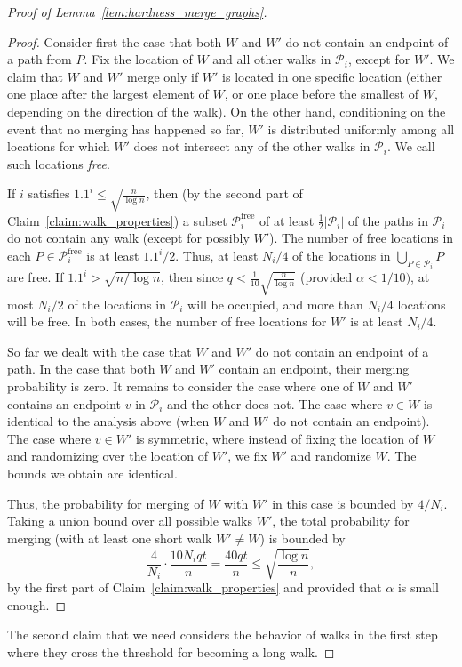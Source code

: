 \documentclass[11pt]{article}
\numberwithin{equation}{section}
\renewcommand{\P}{\mathcal{P}}
\newcommand{\1}{\mathbf{1}}
\begin{document}
\begin{proof}[Proof of Lemma~\ref{lem:hardness_merge_graphs}]
\begin{proof}
Consider first the case that both $W$ and $W'$ do not contain an endpoint of a path from $P$.
Fix the location of $W$ and all other walks in $\mathcal{P}_i$, except for $W'$. We claim that $W$ and $W'$ merge only if $W'$ is located in one specific location (either one place after the largest element of $W$, or one place before the smallest of $W$, depending on the direction of the walk). On the other hand, conditioning on the event that no merging has happened so far, $W'$ is distributed uniformly among all locations for which $W'$ does not intersect any of the other walks in $\P_i$. We call such locations \emph{free}.

If $i$ satisfies $1.1^i \leq \sqrt{\frac{n}{\log n}}$, then (by the second part of Claim~\ref{claim:walk_properties}) a subset $\P_i^{\text{free}}$ of at least $\frac{1}{2} |\P_i|$ of the paths in $\P_i$ do not contain any walk (except for possibly $W'$). The number of free locations in each $P \in \P_i^{\text{free}}$ is at least $1.1^i / 2$. Thus, at least $N_i / 4$ of the locations in $\bigcup_{P \in \P_i} P$ are free. 
If $1.1^i > \sqrt{n / \log{n}}$, then since $q < \frac{1}{10}\sqrt{\frac{n}{\log n}}$ (provided $\alpha < 1/10)$, at most $N_i / 2$ of the locations in $\P_i$ will be occupied, and more than $N_i / 4$ locations will be free. 
In both cases, the number of free locations for $W'$ is at least $N_i / 4$. 

So far we dealt with the case that $W$ and $W'$ do not contain an endpoint of a path. In the case that both $W$ and $W'$ contain an endpoint, their merging probability is zero. It remains to consider the case where one of $W$ and $W'$ contains an endpoint $v$ in $\P_i$ and the other does not. The case where  $v \in W$ is identical to the analysis above (when $W$ and $W'$ do not contain an endpoint). The case where $v \in W'$ is symmetric, where instead of fixing the location of $W$ and randomizing over the location of $W'$, we fix $W'$ and randomize $W$. The bounds we obtain are identical.

Thus, the probability for merging of $W$ with $W'$ in this case is bounded by $4/N_i$. Taking a union bound over all possible walks $W'$,
the total probability for merging (with at least one short walk $W' \neq W$) is bounded by
$$
\frac{4}{N_i} \cdot \frac{10 N_i q t}{n} = \frac{40 q t} {n} \leq \sqrt{\frac{\log n}{n}},
$$
by the first part of Claim~\ref{claim:walk_properties} and provided that $\alpha$ is small enough.
\end{proof}

The second claim that we need considers the behavior of walks in the first step where they cross the threshold for becoming a long walk.


\end{proof}
\end{document}
